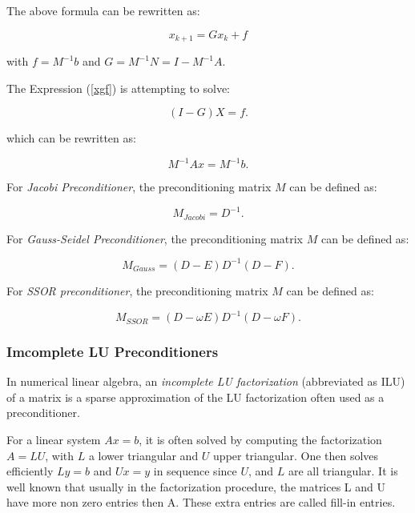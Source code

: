 {The above formula can be rewritten as:

\begin{equation}
\label{xgf}
x_{k+1}=Gx_k+f
\end{equation}

with $f=M^{-1}b$ and $G=M^{-1}N=I-M^{-1}A.$

The Expression (\ref{xgf}) is attempting to solve:

\begin{equation}
(I-G)X=f.
\end{equation}


which can be rewritten as:

\begin{equation}
M^{-1}Ax=M^{-1}b.
\end{equation}

For \textit{Jacobi Preconditioner}, the preconditioning matrix $M$ can be defined as:

\begin{equation}
M_{Jacobi} = D^{-1}.
\end{equation}

For \textit{Gauss-Seidel Preconditioner}, the preconditioning matrix $M$ can be defined as:

\begin{equation}
M_{Gauss} = (D- E)D^{-1}(D- F).
\end{equation}

For \textit{SSOR preconditioner}, the preconditioning matrix $M$ can be defined as:

\begin{equation}
M_{SSOR} =  (D-\omega E)D^{-1}(D-\omega F).
\end{equation}

\subsubsection{Imcomplete LU Preconditioners}

In numerical linear algebra, an \textit{incomplete LU factorization} (abbreviated as ILU) of a matrix is a sparse approximation of the LU factorization often used as a preconditioner.

For a linear system $Ax=b$, it is often solved by computing the factorization $A=LU$, with $L$ a lower triangular and $U$ upper triangular. One then solves efficiently $Ly=b$ and $Ux=y$ in sequence since $U$, and $L$ are all triangular.  It is well known that usually in the factorization procedure, the matrices L and U have more non zero entries then A. These extra entries are called fill-in entries.

}
